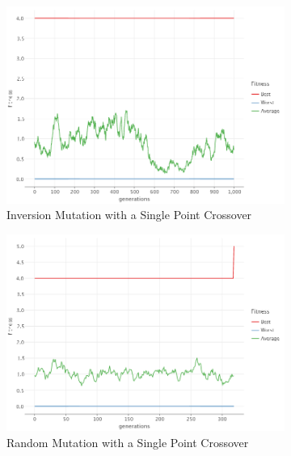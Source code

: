     \begin{figure}[ht!]
        \centering
        \begin{subfigure}{0.45\textwidth}
            \includegraphics[width=\textwidth]{img/beacon_sp_inv_1.png}
            \caption{Inversion Mutation with a Single Point Crossover}
            \label{fig:beacon:1:inversion}
        \end{subfigure}
        \hfill
        \begin{subfigure}{0.45\textwidth}
            \includegraphics[width=\textwidth]{img/beacon_sp_random_1.png}
            \caption{Random Mutation with a Single Point Crossover}
            \label{fig:beacon:1:random}
        \end{subfigure}
        \begin{subfigure}{0.45\textwidth}

\end{subfigure}
\end{figure}
